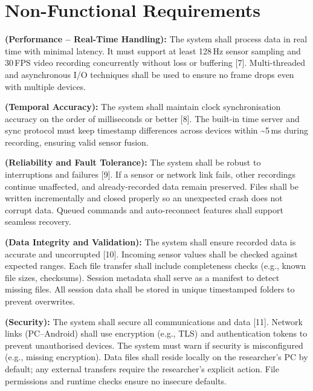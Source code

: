 \section{Non-Functional Requirements}

\begin{description}[style=unboxed,leftmargin=0cm]
    \item[\textbf{NFR1}] \textbf{(Performance – Real-Time Handling):} The system shall process data in real time with minimal latency. It must support at least 128\,Hz sensor sampling and 30\,FPS video recording concurrently without loss or buffering [7]. Multi-threaded and asynchronous I/O techniques shall be used to ensure no frame drops even with multiple devices.

    \item[\textbf{NFR2}] \textbf{(Temporal Accuracy):} The system shall maintain clock synchronisation accuracy on the order of milliseconds or better [8]. The built-in time server and sync protocol must keep timestamp differences across devices within \textasciitilde5\,ms during recording, ensuring valid sensor fusion.

    \item[\textbf{NFR3}] \textbf{(Reliability and Fault Tolerance):} The system shall be robust to interruptions and failures [9]. If a sensor or network link fails, other recordings continue unaffected, and already-recorded data remain preserved. Files shall be written incrementally and closed properly so an unexpected crash does not corrupt data. Queued commands and auto-reconnect features shall support seamless recovery.

    \item[\textbf{NFR4}] \textbf{(Data Integrity and Validation):} The system shall ensure recorded data is accurate and uncorrupted [10]. Incoming sensor values shall be checked against expected ranges. Each file transfer shall include completeness checks (e.g., known file sizes, checksums). Session metadata shall serve as a manifest to detect missing files. All session data shall be stored in unique timestamped folders to prevent overwrites.

    \item[\textbf{NFR5}] \textbf{(Security):} The system shall secure all communications and data [11]. Network links (PC–Android) shall use encryption (e.g., TLS) and authentication tokens to prevent unauthorised devices. The system must warn if security is misconfigured (e.g., missing encryption). Data files shall reside locally on the researcher’s PC by default; any external transfers require the researcher’s explicit action. File permissions and runtime checks ensure no insecure defaults.


\end{description}
